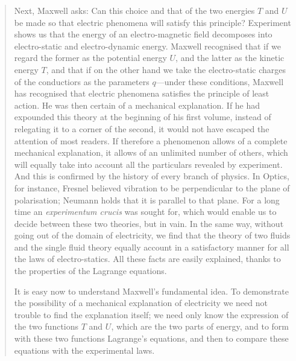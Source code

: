 \begin{quote}
    Next, Maxwell asks: Can this choice and that of the two energies $T$ and $U$ be made so that electric phenomena will satisfy this principle?  Experiment shows us that the energy of an electro-magnetic field decomposes into electro-static and electro-dynamic energy.  Maxwell recognised that if we regard the former as the potential energy $U$, and the latter as the kinetic energy $T$, and that if on the other hand we take the electro-static charges of the conductiors as the parameters $q$---under these conditions, Maxwell has recognised that electric phenomena satisfies the principle of least action.  He was then certain of a mechanical explanation.  If he had expounded this theory at the beginning of his first volume, instead of relegating it to a corner of the second, it would not have escaped the attention of most readers.  If therefore a phenomenon allows of a complete mechanical explanation, it allows of an unlimited number of others, which will equally take into account all the particulars revealed by experiment.  And this is confirmed by the history of every branch of physics.  In Optics, for instance, Fresnel believed vibration to be perpendicular to the plane of polarisation; Neumann holds that it is parallel to that plane.  For a long time an \emph{experimentum crucis} was sought for, which would enable us to decide between these two theories, but in vain.  In the same way, without going out of the domain of electricity, we find that the theory of two fluids and the single fluid theory equally account in a satisfactory manner for all the laws of electro-statics.  All these facts are easily explained, thanks to the properties of the Lagrange equations.
    
    It is easy now to understand Maxwell's fundamental idea.  To demonstrate the possibility of a mechanical explanation of electricity we need not trouble to find the explanation itself; we need only know the expression of the two functions $T$ and $U$, which are the two parts of energy, and to form with these two functions Lagrange's equations, and then to compare these equations with the experimental laws.
    

\end{quote}
